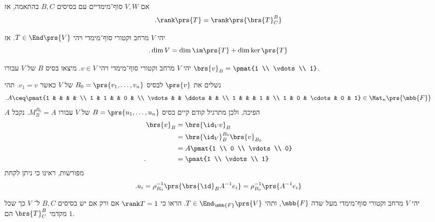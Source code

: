 \documentclass[a4paper,10pt,twoside,openany]{book}
\begin{document}
\begin{remark}
אם
$V,W$
סוף־מימדיים עם בסיסים
$B,C$
בהתאמה, אז
\[\text{.} \rank\prs{T} = \rank\prs{\brs{T}^B_C}\]
\end{remark}

\begin{theorem}
יהי
$V$
מרחב וקטורי סוף־מימדי ויהי
$T \in \End\prs{V}$.
אז
\[\text{.} \dim V = \dim \im\prs{T} + \dim \ker\prs{T}\]
\end{theorem}

\begin{exercisechap}
יהי
$V$
מרחב וקטורי סוף־מימדי ויהי
$v \in V$.
מיצאו בסיס
$B$
של
$V$
עבורו
$\brs{v}_B = \pmat{1 \\ \vdots \\ 1}$.
\end{exercisechap}

\begin{solution}
נשלים את
$\prs{v}$
לבסיס
$B_0 = \prs{v_1, \ldots, v_n}$
של
$V$
כאשר
$v_1 = v$.
תהי
\begin{align*}
\text{.} A \ceq \pmat{1 & & & & \\
1 & 1 & & 0 & \\
\vdots & & \ddots & & \\
1 & & & 1 & \\
1 & 0 & \cdots & 0 & 1} \in \Mat_n\prs{\mbb{F}}
\end{align*}
$A$
הפיכה, ולכן מתרגיל קודם קיים בסיס
$B = \prs{u_1, \ldots, u_n}$
של
$V$
עבורו
$M^{B_0}_B = A$.
נקבל
\begin{align*}
\brs{v}_B &= \brs{\id_V v}_B
\\&=
\brs{\id_V}^{B_0}_{B} \brs{v}_{B_0}
\\&= A \pmat{1 \\ 0 \\ \vdots \\ 0}
\\ \text{.} \hphantom{\brs{v}_B} &= \pmat{1 \\ \vdots \\ 1}
\end{align*}
מפורשות, ראינו כי ניתן לקחת
\[\text{.} u_i = \rho_{B_0}^{-1}\prs{\brs{\id}_B A^{-1} e_i} = \rho_{B_0}^{-1}\prs{A^{-1}e_i}\]
\end{solution}

\begin{exercisechap}
יהי
$V$
מרחב וקטורי סוף־מימדי מעל שדה
$\mbb{F}$,
ותהי
$T \in \End_{\mbb{F}}\prs{V}$.
הראו כי
$\rank T = 1$
אם ורק אם יש בסיסים
$B,C$
ל־%
$V$
כך שכל מקדמי
$\brs{T}^B_C$
הם
$1$.
\end{exercisechap}
\end{document}
